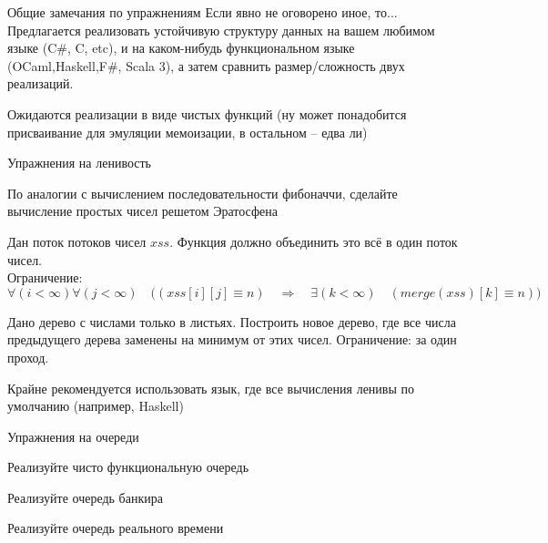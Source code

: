 
\begin{frame}{Общие замечания по упражнениям}
Если явно не оговорено иное, то...
\vspace{3em}
Предлагается реализовать устойчивую структуру данных на вашем любимом языке (C\#, C, etc), и на каком-нибудь функциональном языке (OCaml,Haskell,F\#, Scala 3), а затем сравнить размер/сложность двух реализаций.

Ожидаются реализации в виде чистых функций (ну может понадобится присваивание для эмуляции мемоизации, в остальном -- едва ли)
\end{frame}

\begin{frame}[allowframebreaks]{Упражнения на ленивость}
\begin{exercise}
По аналогии с вычислением последовательности фибоначчи, сделайте вычисление простых чисел решетом Эратосфена
\end{exercise}
\begin{exercise}
Дан поток потоков чисел $xss$. Функция  должно объединить это всё в один поток чисел. \\
Ограничение: $\forall (i<\infty) \forall (j<\infty)\quad \big((xss[i][j]\equiv n)\quad \Longrightarrow \quad\exists (k<\infty)\quad (merge(xss)[k]\equiv n)\big)$
\end{exercise}

\begin{exercise}
Дано дерево с числами только в листьях. Построить новое дерево, где все числа предыдущего дерева заменены на минимум от этих чисел. Ограничение: за один проход.
\begin{remark}
Крайне рекомендуется использовать язык, где все вычисления ленивы по умолчанию (например, Haskell)
\end{remark}
\end{exercise}
\end{frame}



\begin{frame}[allowframebreaks]{Упражнения на очереди}
\begin{exercise}
Реализуйте чисто функциональную очередь
\end{exercise}

\begin{exercise}
Реализуйте очередь банкира
\end{exercise}

\begin{exercise}
Реализуйте очередь реального времени
\end{exercise}
\end{frame}



